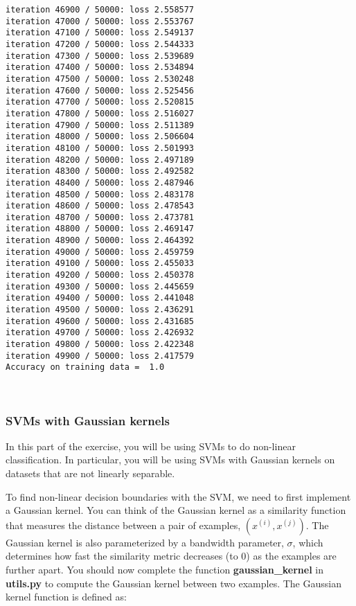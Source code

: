\documentclass[11pt]{article}
\begin{document}
\begin{Verbatim}[commandchars=\\\{\}]
iteration 46900 / 50000: loss 2.558577
iteration 47000 / 50000: loss 2.553767
iteration 47100 / 50000: loss 2.549137
iteration 47200 / 50000: loss 2.544333
iteration 47300 / 50000: loss 2.539689
iteration 47400 / 50000: loss 2.534894
iteration 47500 / 50000: loss 2.530248
iteration 47600 / 50000: loss 2.525456
iteration 47700 / 50000: loss 2.520815
iteration 47800 / 50000: loss 2.516027
iteration 47900 / 50000: loss 2.511389
iteration 48000 / 50000: loss 2.506604
iteration 48100 / 50000: loss 2.501993
iteration 48200 / 50000: loss 2.497189
iteration 48300 / 50000: loss 2.492582
iteration 48400 / 50000: loss 2.487946
iteration 48500 / 50000: loss 2.483178
iteration 48600 / 50000: loss 2.478543
iteration 48700 / 50000: loss 2.473781
iteration 48800 / 50000: loss 2.469147
iteration 48900 / 50000: loss 2.464392
iteration 49000 / 50000: loss 2.459759
iteration 49100 / 50000: loss 2.455033
iteration 49200 / 50000: loss 2.450378
iteration 49300 / 50000: loss 2.445659
iteration 49400 / 50000: loss 2.441048
iteration 49500 / 50000: loss 2.436291
iteration 49600 / 50000: loss 2.431685
iteration 49700 / 50000: loss 2.426932
iteration 49800 / 50000: loss 2.422348
iteration 49900 / 50000: loss 2.417579
Accuracy on training data =  1.0

    \end{Verbatim}

    \begin{center}
    \end{center}
    { \hspace*{\fill} \\}
    
    \hypertarget{svms-with-gaussian-kernels}{%
\subsubsection{SVMs with Gaussian
kernels}\label{svms-with-gaussian-kernels}}

In this part of the exercise, you will be using SVMs to do non-linear
classification. In particular, you will be using SVMs with Gaussian
kernels on datasets that are not linearly separable.

To find non-linear decision boundaries with the SVM, we need to first
implement a Gaussian kernel. You can think of the Gaussian kernel as a
similarity function that measures the distance between a pair of
examples, \((x^{(i)}, x^{(j)})\). The Gaussian kernel is also
parameterized by a bandwidth parameter, \(\sigma\), which determines how
fast the similarity metric decreases (to 0) as the examples are further
apart. You should now complete the function \textbf{gaussian\_kernel} in
\textbf{utils.py} to compute the Gaussian kernel between two examples.
The Gaussian kernel function is defined as:
\end{document}
